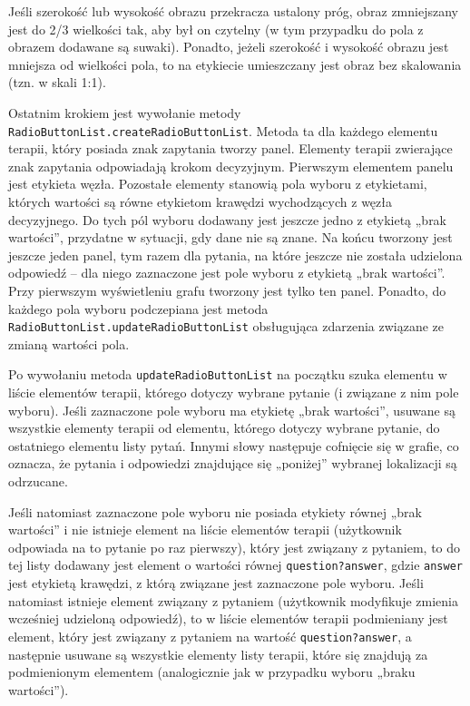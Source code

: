 Jeśli szerokość lub wysokość obrazu przekracza ustalony próg, obraz zmniejszany jest do 2/3 wielkości tak, aby był on czytelny (w tym przypadku do pola z obrazem dodawane są suwaki). Ponadto, jeżeli szerokość i wysokość obrazu jest mniejsza od wielkości pola, to na etykiecie umieszczany jest obraz bez skalowania (tzn. w skali 1:1).
 
Ostatnim krokiem jest wywołanie metody \texttt{RadioButtonList.createRadioButtonList}. Metoda ta dla każdego elementu terapii, który posiada znak zapytania tworzy panel. Elementy terapii zwierające znak zapytania odpowiadają krokom decyzyjnym. Pierwszym elementem panelu jest etykieta węzła. Pozostałe elementy stanowią pola wyboru z etykietami, których wartości są równe etykietom krawędzi wychodzących z węzła decyzyjnego. Do tych pól wyboru dodawany jest jeszcze jedno z etykietą „brak wartości”, przydatne w sytuacji, gdy dane nie są znane. Na końcu tworzony jest jeszcze jeden panel, tym razem dla pytania, na które jeszcze nie została udzielona odpowiedź -- dla niego zaznaczone jest pole wyboru z etykietą „brak wartości”. Przy pierwszym wyświetleniu grafu tworzony jest tylko ten panel. Ponadto, do każdego pola wyboru podczepiana jest metoda \texttt{RadioButtonList.updateRadioButtonList} obsługująca zdarzenia związane ze zmianą wartości pola.

Po wywołaniu metoda \texttt{updateRadioButtonList} na początku szuka elementu w liście elementów terapii, którego dotyczy wybrane pytanie (i związane z nim pole wyboru). Jeśli zaznaczone pole wyboru ma etykietę „brak wartości”, usuwane są wszystkie elementy terapii od elementu, którego dotyczy wybrane pytanie, do ostatniego elementu listy pytań. Innymi słowy następuje cofnięcie się w grafie, co oznacza, że pytania i odpowiedzi znajdujące się „poniżej” wybranej lokalizacji są odrzucane.

Jeśli natomiast zaznaczone pole wyboru nie posiada etykiety równej „brak wartości” i nie istnieje element na liście elementów terapii (użytkownik odpowiada na to pytanie po raz pierwszy), który jest związany z pytaniem, to do tej listy dodawany jest element o wartości równej \texttt{question?answer}, gdzie \texttt{answer} jest etykietą krawędzi, z którą związane jest zaznaczone pole wyboru.  Jeśli natomiast istnieje element związany z pytaniem (użytkownik modyfikuje zmienia wcześniej udzieloną odpowiedź), to w liście elementów terapii podmieniany jest element, który jest związany z pytaniem na wartość \texttt{question?answer}, a następnie usuwane są wszystkie elementy listy terapii, które się znajdują za podmienionym elementem (analogicznie jak w przypadku wyboru „braku wartości”). 

